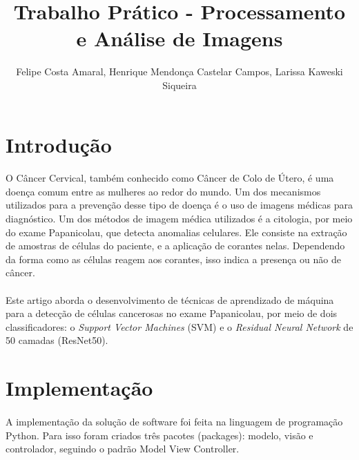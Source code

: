\documentclass[12pt]{article}
\title{Trabalho Prático - Processamento e Análise de Imagens}
\author{Felipe Costa Amaral, Henrique Mendonça Castelar Campos, Larissa Kaweski Siqueira}
\begin{document}
 

\maketitle

\begin{abstract}
  
\end{abstract}
     
\begin{resumo} 
  
\end{resumo}


\section{Introdução}

\paragraph{}O Câncer Cervical, também conhecido como Câncer de Colo de Útero, é uma doença comum entre as mulheres ao redor do mundo. Um dos mecanismos utilizados para a prevenção desse tipo de doença é o uso de imagens médicas para diagnóstico. Um dos métodos de imagem médica utilizados é a citologia, por meio do exame Papanicolau, que detecta anomalias celulares. Ele consiste na extração de amostras de células do paciente, e a aplicação de corantes nelas. Dependendo da forma como as células reagem aos corantes, isso indica a presença ou não de câncer.

\paragraph{}Este artigo aborda o desenvolvimento de técnicas de aprendizado de máquina para a detecção de células cancerosas no exame Papanicolau, por meio de dois classificadores: o \textit{Support Vector Machines} (SVM) e o \textit{Residual Neural Network} de 50 camadas (ResNet50).

\section{Implementação}

\paragraph{}A implementação da solução de software foi feita na linguagem de programação Python. Para isso foram criados três pacotes (packages): modelo, visão e controlador, seguindo o padrão Model View Controller.
\end{document}
